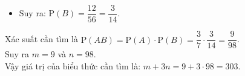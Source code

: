 \begin{ex}
{\begin{itemize}
\begin{itemize}
				\item Công sai $d=1$: $\{1;2;3\}$, $\{2;3;4\}$, $\{3;4;5\}$, $\{4;5;6\}$, $\{5;6;7\}$, $\{6;7;8\}$ $\rightarrow$ có $6$ bộ.
				\item Công sai $d=2$: $\{1;3;5\}$, $\{2;4;6\}$, $\{3;5;7\}$, $\{4;6;8\}$ $\rightarrow$ có $4$ bộ.
				\item Công sai $d=3$: $\{1;4;7\}$, $\{2;5;8\}$ $\rightarrow$ có $2$ bộ.
			\end{itemize}
			Tổng số bộ thỏa mãn là: $6+4+2=12$ bộ.
			\item Suy ra: $\mathrm{P}(B)= \dfrac{12}{56}=\dfrac{3}{14}$.
		\end{itemize}
		Xác suất cần tìm là $\mathrm{P}(AB)=\mathrm{P}(A)\cdot\mathrm{P}(B)=\dfrac{3}{7} \cdot \dfrac{3}{14}=\dfrac{9}{98}$.\\
		Suy ra $m=9$ và $n=98$. \\
		Vậy giá trị của biểu thức cần tìm là: $m+3n=9+3 \cdot 98=303$.}
\end{ex}

